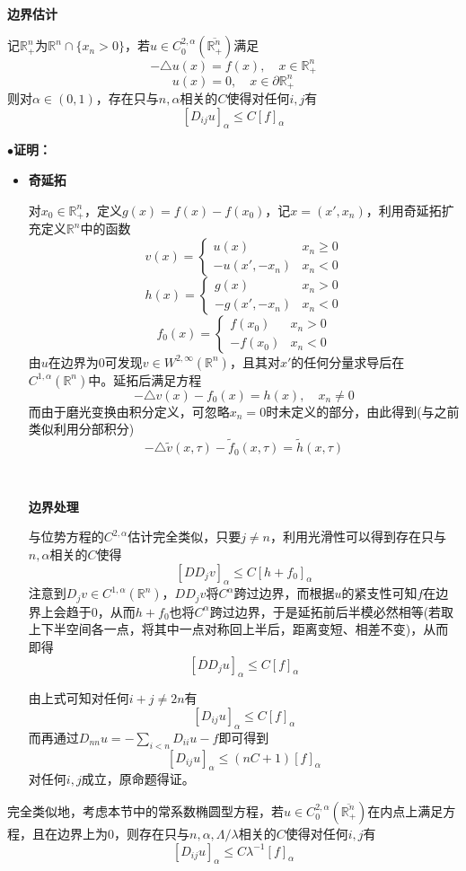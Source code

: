 \documentclass[a4paper,UTF8,fontset=windows,AutoFakeBold]{ctexart}
\newcommand{\proo}[1]{{\kaishu $\bullet$\textbf{证明：}
\begin{itemize}
    \item[] #1
\end{itemize}
}}
\begin{document}
\

\textbf{边界估计}

记$\mathbb{R}^n_+$为$\mathbb{R}^n\cap\{x_n>0\}$，若$u\in C_0^{2,\alpha}(\overline{\mathbb{R}^n_+})$满足
$$-\triangle u(x)=f(x),\quad x\in\mathbb{R}^n_+$$
$$u(x)=0,\quad x\in\partial\mathbb{R}^n_+$$
则对$\alpha\in(0,1)$，存在只与$n,\alpha$相关的$C$使得对任何$i,j$有
$$[D_{ij}u]_\alpha\le C[f]_\alpha$$

\proo{
    \textbf{奇延拓}

    对$x_0\in\mathbb{R}^n_+$，定义$g(x)=f(x)-f(x_0)$，记$x=(x',x_n)$，利用奇延拓扩充定义$\mathbb{R}^n$中的函数
    $$v(x)=\begin{cases}u(x)&x_n\ge0\\-u(x',-x_n)&x_n<0\end{cases}$$
    $$h(x)=\begin{cases}g(x)&x_n>0\\-g(x',-x_n)&x_n<0\end{cases}$$
    $$f_0(x)=\begin{cases}f(x_0)&x_n>0\\-f(x_0)&x_n<0\end{cases}$$
    由$u$在边界为0可发现$v\in W^{2,\infty}(\mathbb{R}^n)$，且其对$x'$的任何分量求导后在$C^{1,\alpha}(\mathbb{R}^n)$中。延拓后满足方程
    $$-\triangle v(x)-f_0(x)=h(x),\quad x_n\ne0$$
    而由于磨光变换由积分定义，可忽略$x_n=0$时未定义的部分，由此得到(与之前类似利用分部积分)
    $$-\triangle\tilde{v}(x,\tau)-\tilde{f}_0(x,\tau)=\tilde{h}(x,\tau)$$

    \
    
    \textbf{边界处理}

    与位势方程的$C^{2,\alpha}$估计完全类似，只要$j\ne n$，利用光滑性可以得到存在只与$n,\alpha$相关的$C$使得
    $$[DD_jv]_\alpha\le C[h+f_0]_\alpha$$
    注意到$D_jv\in C^{1,\alpha}(\mathbb{R}^n)$，$DD_jv$将$C^\alpha$跨过边界，而根据$u$的紧支性可知$f$在边界上会趋于0，从而$h+f_0$也将$C^\alpha$跨过边界，于是延拓前后半模必然相等(若取上下半空间各一点，将其中一点对称回上半后，距离变短、相差不变)，从而即得
    $$[DD_ju]_\alpha\le C[f]_\alpha$$

    由上式可知对任何$i+j\ne 2n$有
    $$[D_{ij}u]_\alpha\le C[f]_\alpha$$
    而再通过$D_{nn}u=-\sum_{i<n}D_{ii}u-f$即可得到
    $$[D_{ij}u]_\alpha\le (nC+1)[f]_\alpha$$
    对任何$i,j$成立，原命题得证。
}

完全类似地，考虑本节中的常系数椭圆型方程，若$u\in C_0^{2,\alpha}(\overline{\mathbb{R}^n_+})$在内点上满足方程，且在边界上为0，则存在只与$n,\alpha,\Lambda/\lambda$相关的$C$使得对任何$i,j$有
$$[D_{ij}u]_\alpha\le C\lambda^{-1}[f]_\alpha$$
\end{document}
